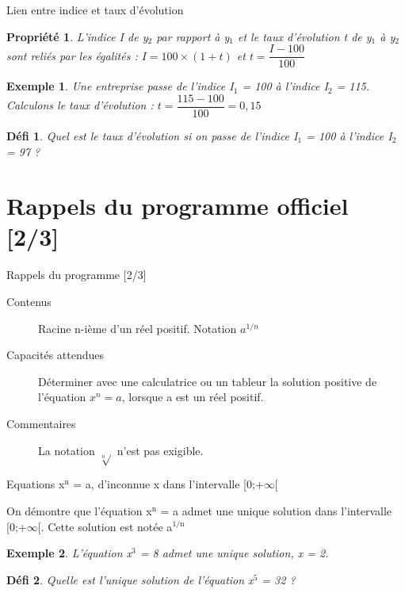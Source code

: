 \documentclass[presentation]{beamer}
\newtheorem{property}{Propriété}[section]
\newtheorem{defi}{Défi}[section]
\newtheorem{exe}{Exemple}[section]
\begin{document}
\begin{frame}[label={sec:orgce3c1f2}]{Lien entre indice et taux d'évolution}
\begin{property}
L'indice I de y\(_{\text{2}}\) par rapport à y\(_{\text{1}}\) et le taux d'évolution t de y\(_{\text{1}}\)
à y\(_{\text{2}}\) sont reliés par les égalités :
\(I = 100\times (1 + t)\) et \(t = \dfrac{I-100}{100}\)
\end{property}

\begin{exe}
Une entreprise passe de l'indice I\(_{\text{1}}\) = 100 à l'indice I\(_{\text{2}}\) = 115. Calculons le
taux d'évolution : \(t = \dfrac{115 - 100}{100} = 0,15\)
\end{exe}

\begin{defi}
Quel est le taux d'évolution si on passe de l'indice I\(_{\text{1}}\) = 100 à
l'indice I\(_{\text{2}}\) = 97 ?
\end{defi}
\end{frame}
\section{Rappels du programme officiel [2/3]}
\label{sec:org03c50d0}
\begin{frame}[label={sec:org2b05f23}]{Rappels du programme [2/3]}
\begin{description}
\item[{Contenus}] Racine n-ième d'un réel positif. Notation \(a^{1/n}\)
\item[{Capacités attendues}] Déterminer avec une calculatrice ou un
tableur la solution positive de l'équation \(x^n = a\), lorsque
a est un réel positif.
\item[{Commentaires}] La notation \(\sqrt[n]{}\) n'est pas exigible.
\end{description}
\end{frame}

\begin{frame}[label={sec:org09adba9}]{Equations x\(^{\text{n}}\) = a, d'inconnue x dans l'intervalle [0;+\(\infty\)[}
\begin{definition}
On démontre que \alert{l'équation x\(^{\text{n}}\) = a} admet une unique solution dans
l'intervalle [0;+\(\infty\)[. Cette solution est notée a\(^{\text{1/n}}\)
\end{definition}

\begin{exe}
L'équation x\(^{\text{3}}\) = 8 admet une unique solution, x = 2.
\end{exe}

\begin{defi}
Quelle est l'unique solution de l'équation x\(^{\text{5}}\) = 32 ?
\end{defi}
\end{frame}
\end{document}
